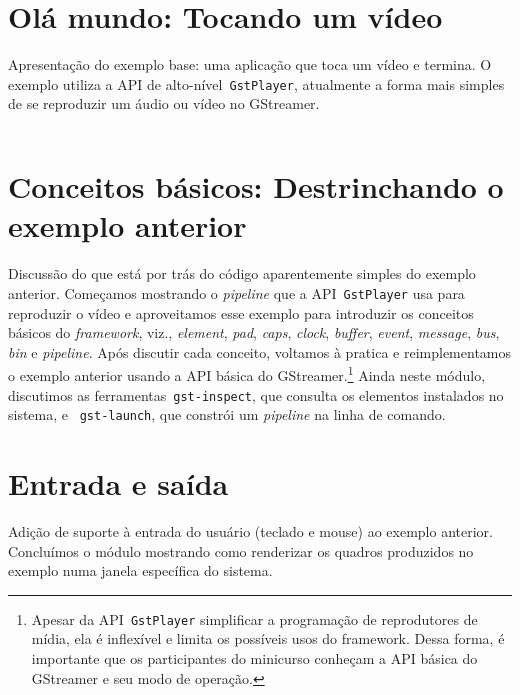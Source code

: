 \documentclass{SBCbookchapter}
\newcommand{\inputc}[1]{\inputminted[fontsize=\footnotesize,breaklines,linenos]{c}{#1}}
\begin{document}
%


\section{Olá mundo: Tocando um vídeo}
Apresentação do exemplo base: uma aplicação que toca um vídeo e termina.  O
exemplo utiliza a API de alto-nível~\texttt{GstPlayer}, atualmente a forma mais
simples de se reproduzir um áudio ou vídeo no GStreamer.

\inputc{src/helloworld-01.c}


\section{Conceitos básicos: Destrinchando o exemplo anterior}
Discussão do que está por trás do código aparentemente simples do exemplo
anterior.  Começamos mostrando o \emph{pipeline} que a API~\texttt{GstPlayer}
usa para reproduzir o vídeo e aproveitamos esse exemplo para introduzir os
conceitos básicos do \emph{framework}, viz., \emph{element}, \emph{pad},
\emph{caps}, \emph{clock}, \emph{buffer}, \emph{event}, \emph{message},
\emph{bus}, \emph{bin} e \emph{pipeline}.  Após discutir cada conceito,
voltamos à pratica e reimplementamos o exemplo anterior usando a API básica do
GStreamer.\footnote{Apesar da API~\texttt{GstPlayer} simplificar a programação
de reprodutores de mídia, ela é inflexível e limita os possíveis usos do
framework.  Dessa forma, é importante que os participantes do minicurso
conheçam a API básica do GStreamer e seu modo de operação.}  Ainda neste
módulo, discutimos as ferramentas~\texttt{gst-inspect}, que consulta os
elementos instalados no sistema, e ~\texttt{gst-launch}, que constrói um
\emph{pipeline} na linha de comando.


\section{Entrada e saída}
Adição de suporte à entrada do usuário (teclado e mouse) ao exemplo anterior.
Concluímos o módulo mostrando como renderizar os quadros produzidos no exemplo
numa janela específica do sistema.
\end{document}
